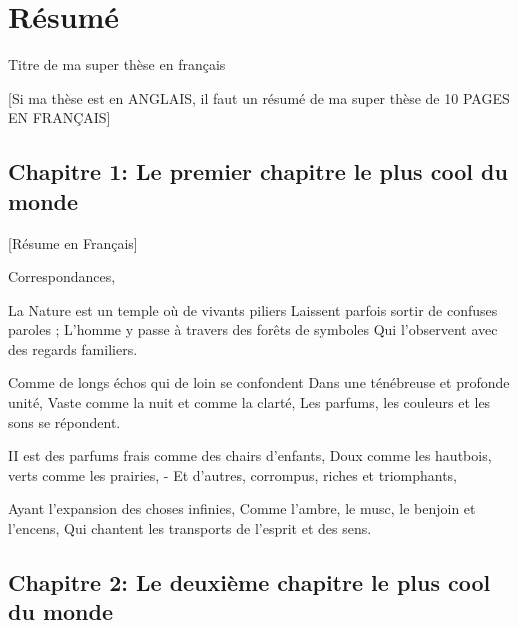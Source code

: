 \chapter*{Résumé}

\vspace{1.5cm}
    {\Huge Titre de ma super thèse en français}

\vspace{1.5cm}

\newpage
\raggedbottom

\onehalfspacing
\setcounter{footnote}{0}
\renewcommand{\thefootnote}{\arabic{footnote}}

[Si ma thèse est en ANGLAIS, il faut un résumé de ma super thèse de 10 PAGES EN FRANÇAIS]\newline {}


\section*{Chapitre 1: Le premier chapitre le plus cool du monde}

[Résume en Français]\newline \newline


Correspondances,  \newline \newline


La Nature est un temple où de vivants piliers
Laissent parfois sortir de confuses paroles ;
L'homme y passe à travers des forêts de symboles
Qui l'observent avec des regards familiers.

Comme de longs échos qui de loin se confondent
Dans une ténébreuse et profonde unité,
Vaste comme la nuit et comme la clarté,
Les parfums, les couleurs et les sons se répondent.

II est des parfums frais comme des chairs d'enfants,
Doux comme les hautbois, verts comme les prairies,
- Et d'autres, corrompus, riches et triomphants,

Ayant l'expansion des choses infinies,
Comme l'ambre, le musc, le benjoin et l'encens,
Qui chantent les transports de l'esprit et des sens.



\section*{Chapitre 2: Le deuxième chapitre le plus cool du monde}

